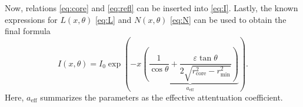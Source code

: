 Now, relations \eqref{eq:core} and \eqref{eq:refl} can be inserted into \eqref{eq:I}. Lastly, the known expressions
for $L(x, \theta)$ \eqref{eq:L} and $N(x, \theta)$ \eqref{eq:N} can be used to obtain the final formula
\begin{equation}
    I(x, \theta) = I_0 \exp{ \left( -x \underbrace{\left(\frac{1}{\cos{\theta}} + \frac{\varepsilon \tan{\theta}}{2 \sqrt{r_\text{core}^2-r_\text{min}^2}} \right)}_{a_\text{eff}} \right)} .
    \label{eq:Attentuation}
\end{equation}
Here, $a_\text{eff}$ summarizes the parameters as the effective attentuation coefficient.
